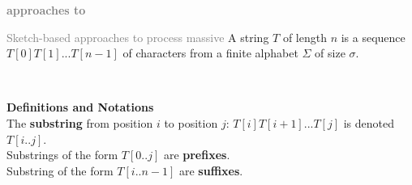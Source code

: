 
\begin{frame}
    \vfill
    \bigskip
    \begin{center}
        \large
        \textbf{ \textcolor{gray}{approaches to}   }
    \end{center}
    \vfill
\end{frame}

\def\stringseashells{S,h,e,\_,s,e,l,l,s,\_,s,e,a,s,h,e,l,l,s,\_,b,y,\_,t,h,e,\_,s,e,a,s,h,o,r,e}
\def\stringstruggled{I, ,s,t,r,u,g,g,l,e,d, ,t,o, ,m,a,k,e, ,t,h,i,s, ,f,i,g,u,r,e, ,w,i,t,h, ,t,i,k,z,!}


\begin{frame}{\textcolor{gray}{Sketch-based approaches to process massive }}
    \pause
    A string $T$ of length $n$ is a sequence $T[0]T[1]...T[n-1]$ of characters from a finite alphabet $\Sigma$ of size $\sigma$.\\
    \begin{center}
        \\
    \end{center}
    \textbf{Definitions and Notations}\\
    The \textbf{substring} from position $i$ to position $j$: $T[i]T[i+1]...T[j]$ is denoted $T[i..j]$.\\
    Substrings of the form $T[0..j]$ are \textbf{prefixes}.\\
    Substring of the form $T[i..n-1]$ are \textbf{suffixes}.
    \pause \pause
\end{frame}

